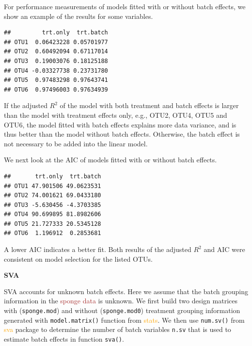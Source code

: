 \documentclass[
]{book}
\newenvironment{Shaded}{\begin{snugshade}}{\end{snugshade}}
\newcommand{\FunctionTok}[1]{\textcolor[rgb]{0.00,0.00,0.00}{#1}}
\newcommand{\NormalTok}[1]{#1}
\newcommand{\SpecialCharTok}[1]{\textcolor[rgb]{0.00,0.00,0.00}{#1}}
\begin{document}
For performance measurements of models fitted with or without batch effects, we show an example of the results for some variables.

\begin{Shaded}
\end{Shaded}

\begin{verbatim}
##         trt.only  trt.batch
## OTU1  0.06423228 0.05701977
## OTU2  0.60492094 0.67117014
## OTU3  0.19003076 0.18125188
## OTU4 -0.03327738 0.23731780
## OTU5  0.97483298 0.97643741
## OTU6  0.97496003 0.97634939
\end{verbatim}

If the adjusted \(R^2\) of the model with both treatment and batch effects is larger than the model with treatment effects only, e.g., OTU2, OTU4, OTU5 and OTU6, the model fitted with batch effects explains more data variance, and is thus better than the model without batch effects. Otherwise, the batch effect is not necessary to be added into the linear model.

We next look at the AIC of models fitted with or without batch effects.

\begin{Shaded}
\end{Shaded}

\begin{verbatim}
##       trt.only  trt.batch
## OTU1 47.901506 49.0623531
## OTU2 74.001621 69.0433180
## OTU3 -5.630456 -4.3703385
## OTU4 90.699895 81.8982606
## OTU5 21.727333 20.5345128
## OTU6  1.196912  0.2853681
\end{verbatim}

A lower AIC indicates a better fit. Both results of the adjusted \(R^2\) and AIC were consistent on model selection for the listed OTUs.

\textbf{SVA}

SVA accounts for unknown batch effects. Here we assume that the batch grouping information in the \textcolor{brown}{sponge data} is unknown. We first build two design matrices with (\texttt{sponge.mod}) and without (\texttt{sponge.mod0}) treatment grouping information generated with \texttt{model.matrix()} function from \textcolor{orange}{stats}. We then use \texttt{num.sv()} from \textcolor{orange}{sva} package to determine the number of batch variables \texttt{n.sv} that is used to estimate batch effects in function \texttt{sva()}.
\end{document}
